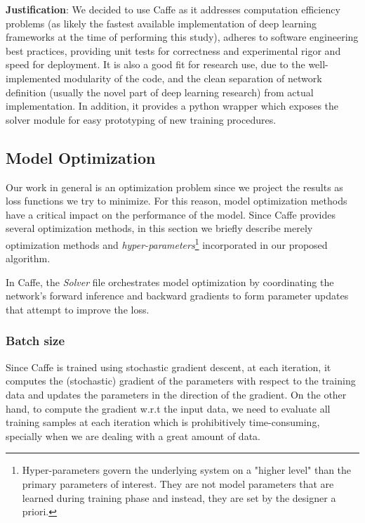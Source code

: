 \textbf{Justification}: We decided to use Caffe as  it addresses computation efficiency problems (as likely the fastest available implementation of deep learning frameworks at the time of performing this study), adheres to software engineering best practices, providing unit tests for correctness and experimental rigor and speed for deployment. It is also a good fit for research use, due to the well-implemented modularity of the code, and the clean separation of network definition (usually the novel part of deep learning research) from actual implementation\cite{jia2014caffe}. In addition, it provides a python wrapper which exposes the solver module for easy prototyping of new training procedures. 

\subsection{Model Optimization}

Our work in general is an optimization problem since we project the results as loss functions we try to minimize. For this reason, model optimization methods have a critical impact on the performance of the model. Since Caffe provides several optimization methods, in this section we briefly describe merely optimization methods and \textit{hyper-parameters}\footnote{Hyper-parameters govern the underlying system on a "higher level" than the primary parameters of interest. They are not model parameters that are learned during training phase and instead, they are set by the designer a priori.} incorporated in our proposed algorithm.  

\indent In Caffe, the \textit{Solver} file  orchestrates model optimization by coordinating the network's forward inference and backward gradients to form parameter updates that attempt to improve the loss. 

\subsubsection{Batch size}

Since Caffe is trained using stochastic gradient descent, at each iteration, it computes the (stochastic) gradient of the parameters with respect to the training data and updates the parameters in the direction of the gradient. On the other hand, to compute the gradient w.r.t the input data, we need to evaluate all training samples at each iteration which is prohibitively time-consuming, specially when we are dealing with a great amount of data. 

